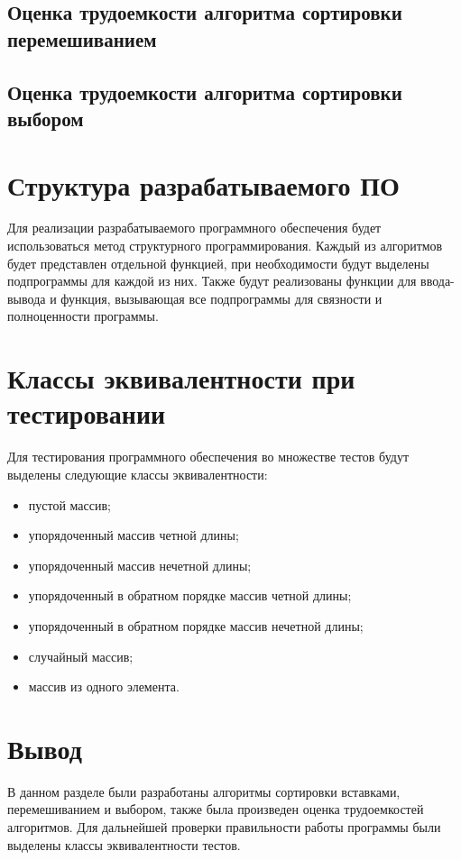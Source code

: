 
\subsection{Оценка трудоемкости алгоритма сортировки перемешиванием}


\subsection{Оценка трудоемкости алгоритма сортировки выбором}


\section{Структура разрабатываемого ПО}

Для реализации разрабатываемого программного обеспечения будет использоваться
метод структурного программирования. Каждый из алгоритмов будет представлен
отдельной функцией, при необходимости будут выделены подпрограммы для каждой из
них. Также будут реализованы функции для ввода-вывода и функция, вызывающая все
подпрограммы для связности и полноценности программы.

\section{Классы эквивалентности при тестировании}

Для тестирования программного обеспечения во множестве тестов будут выделены
следующие классы эквивалентности:
\begin{itemize}[left=\parindent]
    \item пустой массив; 
    \item упорядоченный массив четной длины;
    \item упорядоченный массив нечетной длины;
    \item упорядоченный в обратном порядке массив четной длины;
    \item упорядоченный в обратном порядке массив нечетной длины;
    \item случайный массив;
    \item массив из одного элемента.
\end{itemize}

\section{Вывод}

В данном разделе были разработаны алгоритмы сортировки вставками,
перемешиванием и выбором, также была произведен оценка трудоемкостей
алгоритмов. Для дальнейшей проверки правильности работы программы были выделены
классы эквивалентности тестов.
